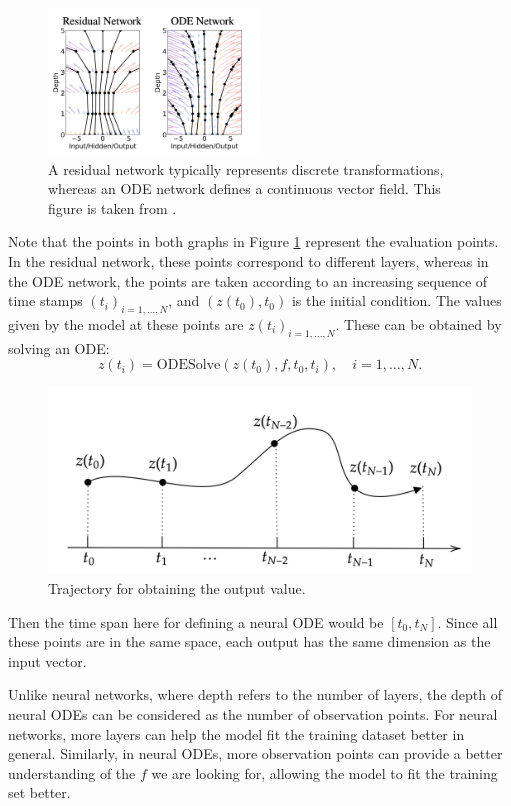 \documentclass[a4paper,11pt,titlepage]{article}
\theoremstyle{definition}
\theoremstyle{plain}
\theoremstyle{remark}
\begin{document}
\begin{figure}[htbp]
    \centering
    \includegraphics[width=0.5\textwidth]{report/figures/ResNetvsODENet.png}
    \caption{A residual network typically represents discrete transformations, whereas an ODE network defines a continuous vector field. This figure is taken from \cite{chen2018neural}.}
    \label{fig:resnettoneuralODE}
\end{figure}

Note that the points in both graphs in Figure \ref{fig:resnettoneuralODE} represent the evaluation points. In the residual network, these points correspond to different layers, whereas in the ODE network, the points are taken according to an increasing sequence of time stamps $(t_i)_{i=1,\dots,N}$, and $\left(z(t_0),t_0\right)$ is the initial condition. The values given by the model at these points are $z(t_i)_{i=1,\dots,N}$. These can be obtained by solving an ODE:
$$z(t_i)=\mathrm{ODESolve}\left(z(t_0),f,t_0,t_i\right),\quad i=1,\dots,N.$$

\begin{figure}[htbp]
    \centering
    \includegraphics[width=0.5\linewidth]{report/figures/ForwardODE.png}
    \caption{Trajectory for obtaining the output value.}
\end{figure}

Then the time span here for defining a neural ODE would be $[t_0,t_N]$. Since all these points are in the same space, each output has the same dimension as the input vector.

Unlike neural networks, where depth refers to the number of layers, the depth of neural ODEs can be considered as the number of observation points. For neural networks, more layers can help the model fit the training dataset better in general. Similarly, in neural ODEs, more observation points can provide a better understanding of the $f$ we are looking for, allowing the model to fit the training set better.
\end{document}
